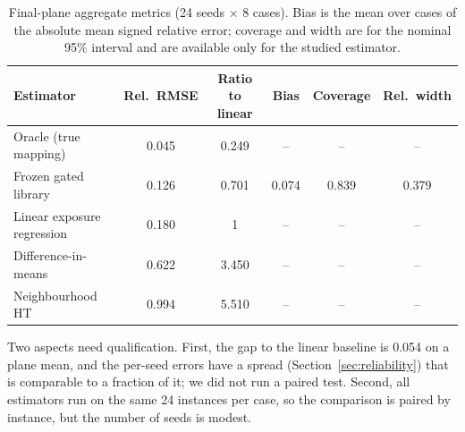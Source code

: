 \documentclass{article}
\begin{document}
\begin{table}[t]
\centering\small
\caption{Final-plane aggregate metrics (24 seeds $\times$ 8 cases). Bias is the mean over cases of the absolute mean signed relative error; coverage and width are for the nominal 95\% interval and are available only for the studied estimator.}
\label{tab:agg}
\begin{tabular}{lccccc}
\toprule
Estimator & Rel.\ RMSE & Ratio to linear & Bias & Coverage & Rel.\ width\\
\midrule
Oracle (true mapping) & 0.045 & 0.249 & -- & -- & --\\ %
Frozen gated library & 0.126 & 0.701 & 0.074 & 0.839 & 0.379\\ %
Linear exposure regression & 0.180 & 1 & -- & -- & --\\ %
Difference-in-means & 0.622 & 3.450 & -- & -- & --\\ %
Neighbourhood HT & 0.994 & 5.510 & -- & -- & --\\ %
\bottomrule
\end{tabular}
\end{table}

Two aspects need qualification. First, the gap to the linear baseline is 0.054 on a plane mean, %
 and the per-seed errors have a spread (Section~\ref{sec:reliability}) that is comparable to a fraction of it; we did not run a paired test. Second, all estimators run on the same 24 instances per case, so the comparison is paired by instance, but the number of seeds is modest.
\end{document}
